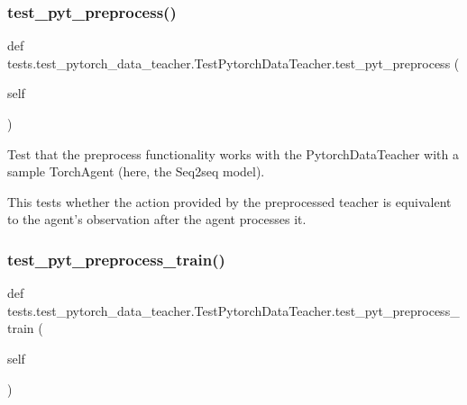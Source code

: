 \subsubsection{\texorpdfstring{test\+\_\+pyt\+\_\+preprocess()}{test\_pyt\_preprocess()}}
{\footnotesize\ttfamily def tests.\+test\+\_\+pytorch\+\_\+data\+\_\+teacher.\+Test\+Pytorch\+Data\+Teacher.\+test\+\_\+pyt\+\_\+preprocess (\begin{DoxyParamCaption}\item[{}]{self }\end{DoxyParamCaption})}

\begin{DoxyVerb}Test that the preprocess functionality works with the PytorchDataTeacher with a
sample TorchAgent (here, the Seq2seq model).

This tests whether the action provided by the preprocessed teacher is equivalent
to the agent's observation after the agent processes it.
\end{DoxyVerb}
 \mbox{\label{classtests_1_1test__pytorch__data__teacher_1_1TestPytorchDataTeacher_a3ba46374c7e9068827af1b90f35c832e}} 
\subsubsection{\texorpdfstring{test\+\_\+pyt\+\_\+preprocess\+\_\+train()}{test\_pyt\_preprocess\_train()}}
{\footnotesize\ttfamily def tests.\+test\+\_\+pytorch\+\_\+data\+\_\+teacher.\+Test\+Pytorch\+Data\+Teacher.\+test\+\_\+pyt\+\_\+preprocess\+\_\+train (\begin{DoxyParamCaption}\item[{}]{self }\end{DoxyParamCaption})}

